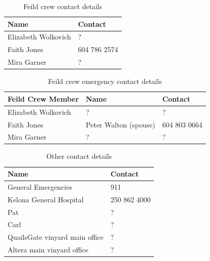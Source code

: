 \documentclass[11pt,letter]{article}
\begin{document}
\begin{table}[H]
\caption{Feild crew contact details} %
\begin{tabular}{ l | l }  %
\hline\hline %
Name & Contact\\ [0.5ex] %
\hline %
Elizabeth Wolkovich & ? \\ %
Faith Jones & 604 786 2574 \\
Mira Garner & ? \\
\hline %
\end{tabular}
\label{table:nonlin} %
\end{table}

\begin{table}[H]
\caption{Feild crew emergency contact details} %
\begin{tabular}{l l l} %
\hline\hline %
Feild Crew Member & Name & Contact\\ [0.5ex] %
\hline %
Elizabeth Wolkovich & ? & ? \\ %
Faith Jones & Peter Walton (spouse) & 604 803 0664\\
Mira Garner & ? & ? \\
\hline %
\end{tabular}
\label{table:nonlin} %
\end{table}

\begin{table}[H]
\caption{Other contact details} %
\begin{tabular}{l l} %
\hline\hline %
Name & Contact \\ [0.5ex] %
\hline %
General Emergencies & 911 \\ %
Kelona General Hospital & 250 862 4000 \\
Pat & ?\\
Carl & ?\\
QuailsGate vinyard main office & ? \\
Altera main vinyard office & ? \\

\hline %
\end{tabular}
\label{table:nonlin} %
\end{table}
\end{document}
